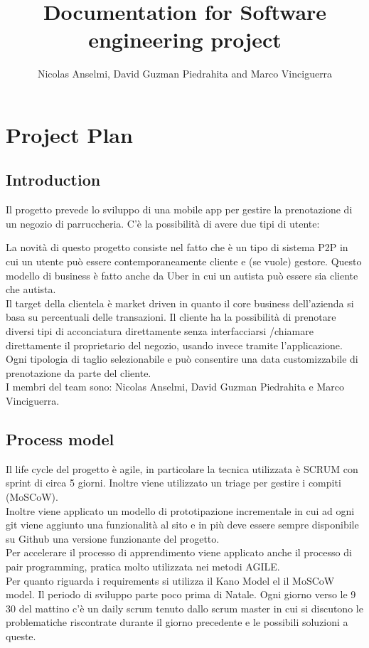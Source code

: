 \documentclass{article}
\title{Documentation for Software engineering project}
\author{Nicolas Anselmi, David Guzman Piedrahita and Marco Vinciguerra}
\begin{document}
\maketitle        
\section{Project Plan}
\subsection{Introduction}
Il progetto prevede lo sviluppo di una mobile app per gestire la prenotazione di 
un negozio di parruccheria. C'è la possibilità di avere due tipi di utente:

 La novità di questo progetto consiste nel fatto che è un tipo di sistema P2P in cui un utente può essere contemporaneamente cliente
e (se vuole) gestore. Questo modello di business è fatto anche da Uber in cui un autista può essere sia cliente che autista.
\\Il target della clientela è market driven in quanto il core business dell'azienda si basa su percentuali delle transazioni.
Il cliente ha la possibilità di prenotare diversi 
tipi di acconciatura direttamente senza interfacciarsi /chiamare direttamente il proprietario
del negozio, usando invece tramite l'applicazione. Ogni tipologia di taglio selezionabile e può consentire una data customizzabile di prenotazione 
da parte del cliente. 
\\I membri del team sono: Nicolas Anselmi, David Guzman Piedrahita e Marco Vinciguerra.
   
\subsection{Process model}
Il life cycle del progetto è agile, in particolare la tecnica utilizzata è SCRUM con
sprint di circa 5 giorni. Inoltre viene utilizzato un triage per
gestire i compiti (MoSCoW).
\\Inoltre viene applicato un modello di prototipazione incrementale in cui ad ogni git viene aggiunto una funzionalità al sito e in più deve essere sempre disponibile
su Github una versione funzionante del progetto.
\\Per accelerare il processo di apprendimento viene applicato anche il processo di pair programming, 
pratica molto utilizzata nei metodi AGILE.
\\Per quanto riguarda i requirements si utilizza il Kano Model el il MoSCoW model.
Il periodo di sviluppo parte poco prima di Natale. Ogni giorno verso le 9 30 del mattino 
c'è un daily scrum tenuto dallo scrum master in cui si discutono le problematiche riscontrate durante 
il giorno precedente e le possibili soluzioni a queste.
\end{document}
